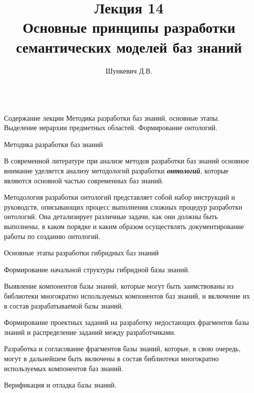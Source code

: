 \title{Лекция 14\\Основные принципы разработки семантических моделей баз знаний}
\author[]{Шункевич Д.В.}

\begin{frame}
	\titlepage
\end{frame}

\begin{frame}{\\Содержание лекции}
	\topline
	\justifying
	Методика разработки баз знаний, основные этапы. Выделение иерархии предметных областей. Формирование онтологий.
\end{frame}

\begin{frame}{Методика разработки баз знаний}
	\topline
	\justifying 

	В современной литературе при анализе методов разработки баз знаний основное внимание уделяется анализу методологий разработки \textbf{\textit{онтологий}}, которые являются основной частью современных баз знаний.
 
    Методология разработки онтологий представляет собой набор инструкций и руководств, описывающих процесс выполнения сложных процедур разработки онтологий. Она детализирует различные задачи, как они должны быть выполнены, в каком порядке и каким образом осуществлять документирование работы по созданию онтологий.
    
\end{frame}

\begin{frame}{Основные этапы разработки гибридных баз знаний}
	\topline
	\justifying
	\vspace{8mm}
	\begin{textitemize}
		\item Формирование начальной структуры гибридной базы знаний.
		\item Выявление компонентов базы знаний, которые могут быть заимствованы из библиотеки многократно используемых компонентов баз знаний, и включение их в состав разрабатываемой базы знаний.
		\item Формирование проектных заданий на разработку недостающих фрагментов базы знаний и распределение заданий между разработчиками.
		\item Разработка и согласование фрагментов базы знаний, которые, в свою очередь, могут в дальнейшем быть включены в состав библиотеки многократно используемых компонентов баз знаний.
		\item Верификация и отладка базы знаний.
	\end{textitemize}
\end{frame}

